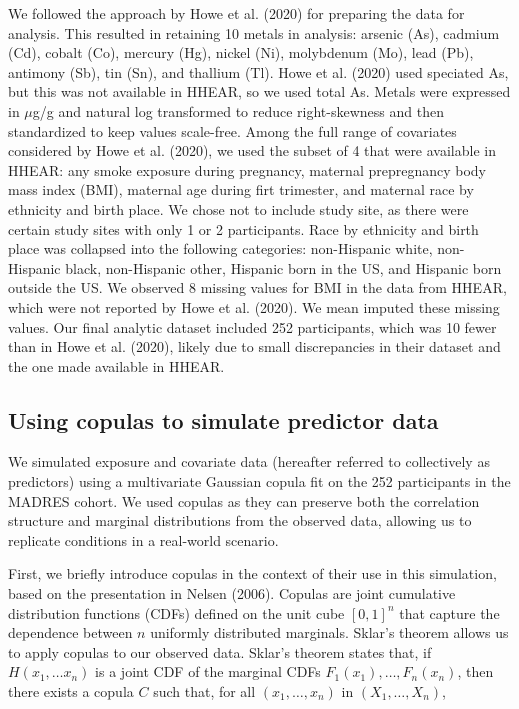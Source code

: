 \documentclass[12pt, twoside]{amherstthesis}
\begin{document}
We followed the approach by Howe et al. (2020) for preparing the data for analysis. This resulted in retaining 10 metals in analysis: arsenic (As), cadmium (Cd), cobalt (Co), mercury (Hg), nickel (Ni), molybdenum (Mo), lead (Pb), antimony (Sb), tin (Sn), and thallium (Tl). Howe et al. (2020) used speciated As, but this was not available in HHEAR, so we used total As. Metals were expressed in \(\mu\)g/g and natural log transformed to reduce right-skewness and then standardized to keep values scale-free. Among the full range of covariates considered by Howe et al. (2020), we used the subset of 4 that were available in HHEAR: any smoke exposure during pregnancy, maternal prepregnancy body mass index (BMI), maternal age during firt trimester, and maternal race by ethnicity and birth place. We chose not to include study site, as there were certain study sites with only 1 or 2 participants. Race by ethnicity and birth place was collapsed into the following categories: non-Hispanic white, non-Hispanic black, non-Hispanic other, Hispanic born in the US, and Hispanic born outside the US. We observed 8 missing values for BMI in the data from HHEAR, which were not reported by Howe et al. (2020). We mean imputed these missing values. Our final analytic dataset included 252 participants, which was 10 fewer than in Howe et al. (2020), likely due to small discrepancies in their dataset and the one made available in HHEAR.

\hypertarget{copula}{%
\subsection{Using copulas to simulate predictor data}\label{copula}}

We simulated exposure and covariate data (hereafter referred to collectively as predictors) using a multivariate Gaussian copula fit on the 252 participants in the MADRES cohort. We used copulas as they can preserve both the correlation structure and marginal distributions from the observed data, allowing us to replicate conditions in a real-world scenario.

First, we briefly introduce copulas in the context of their use in this simulation, based on the presentation in Nelsen (2006). Copulas are joint cumulative distribution functions (CDFs) defined on the unit cube \([0,1]^n\) that capture the dependence between \(n\) uniformly distributed marginals. Sklar's theorem allows us to apply copulas to our observed data. Sklar's theorem states that, if \(H(x_1, \dots x_n)\) is a joint CDF of the marginal CDFs \(F_1(x_1), \dots, F_n(x_n)\), then there exists a copula \(C\) such that, for all \((x_1, \dots, x_n)\) in \((X_1, \dots, X_n)\),
\end{document}
